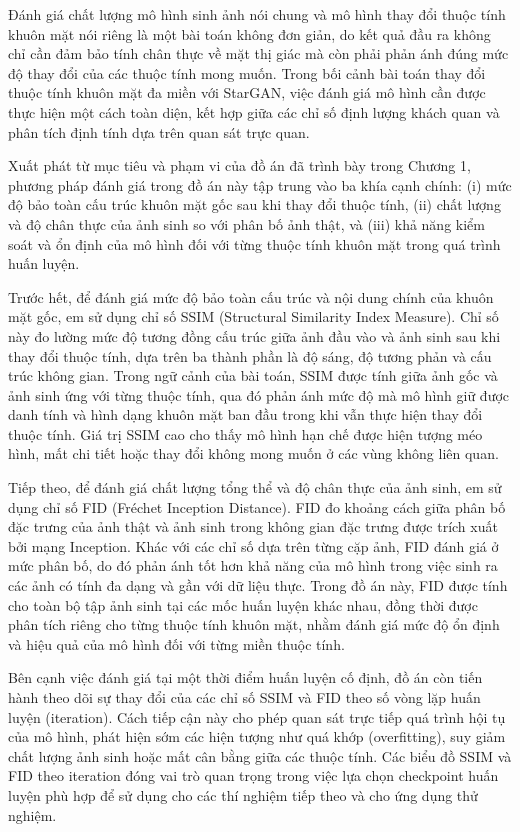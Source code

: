 \documentclass[../DoAn.tex]{subfiles}
\begin{document}
Đánh giá chất lượng mô hình sinh ảnh nói chung và mô hình thay đổi thuộc tính khuôn mặt nói riêng là một bài toán không đơn giản, do kết quả đầu ra không chỉ cần đảm bảo tính chân thực về mặt thị giác mà còn phải phản ánh đúng mức độ thay đổi của các thuộc tính mong muốn. Trong bối cảnh bài toán thay đổi thuộc tính khuôn mặt đa miền với StarGAN, việc đánh giá mô hình cần được thực hiện một cách toàn diện, kết hợp giữa các chỉ số định lượng khách quan và phân tích định tính dựa trên quan sát trực quan.

Xuất phát từ mục tiêu và phạm vi của đồ án đã trình bày trong Chương 1, phương pháp đánh giá trong đồ án này tập trung vào ba khía cạnh chính: (i) mức độ bảo toàn cấu trúc khuôn mặt gốc sau khi thay đổi thuộc tính, (ii) chất lượng và độ chân thực của ảnh sinh so với phân bố ảnh thật, và (iii) khả năng kiểm soát và ổn định của mô hình đối với từng thuộc tính khuôn mặt trong quá trình huấn luyện.

Trước hết, để đánh giá mức độ bảo toàn cấu trúc và nội dung chính của khuôn mặt gốc, em sử dụng chỉ số SSIM (Structural Similarity Index Measure). Chỉ số này đo lường mức độ tương đồng cấu trúc giữa ảnh đầu vào và ảnh sinh sau khi thay đổi thuộc tính, dựa trên ba thành phần là độ sáng, độ tương phản và cấu trúc không gian. Trong ngữ cảnh của bài toán, SSIM được tính giữa ảnh gốc và ảnh sinh ứng với từng thuộc tính, qua đó phản ánh mức độ mà mô hình giữ được danh tính và hình dạng khuôn mặt ban đầu trong khi vẫn thực hiện thay đổi thuộc tính. Giá trị SSIM cao cho thấy mô hình hạn chế được hiện tượng méo hình, mất chi tiết hoặc thay đổi không mong muốn ở các vùng không liên quan.

Tiếp theo, để đánh giá chất lượng tổng thể và độ chân thực của ảnh sinh, em sử dụng chỉ số FID (Fréchet Inception Distance). FID đo khoảng cách giữa phân bố đặc trưng của ảnh thật và ảnh sinh trong không gian đặc trưng được trích xuất bởi mạng Inception. Khác với các chỉ số dựa trên từng cặp ảnh, FID đánh giá ở mức phân bố, do đó phản ánh tốt hơn khả năng của mô hình trong việc sinh ra các ảnh có tính đa dạng và gần với dữ liệu thực. Trong đồ án này, FID được tính cho toàn bộ tập ảnh sinh tại các mốc huấn luyện khác nhau, đồng thời được phân tích riêng cho từng thuộc tính khuôn mặt, nhằm đánh giá mức độ ổn định và hiệu quả của mô hình đối với từng miền thuộc tính.

Bên cạnh việc đánh giá tại một thời điểm huấn luyện cố định, đồ án còn tiến hành theo dõi sự thay đổi của các chỉ số SSIM và FID theo số vòng lặp huấn luyện (iteration). Cách tiếp cận này cho phép quan sát trực tiếp quá trình hội tụ của mô hình, phát hiện sớm các hiện tượng như quá khớp (overfitting), suy giảm chất lượng ảnh sinh hoặc mất cân bằng giữa các thuộc tính. Các biểu đồ SSIM và FID theo iteration đóng vai trò quan trọng trong việc lựa chọn checkpoint huấn luyện phù hợp để sử dụng cho các thí nghiệm tiếp theo và cho ứng dụng thử nghiệm.
\end{document}
